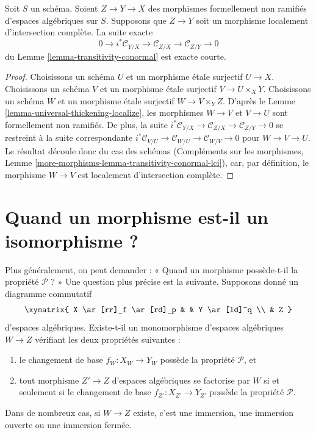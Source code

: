 \begin{lemma}
\label{lemma-transitivity-conormal-lci}
Soit $S$ un schéma. Soient $Z \to Y \to X$ des morphismes formellement non ramifiés
d'espaces algébriques sur $S$. Supposons que $Z \to Y$ soit un morphisme localement
d'intersection complète. La suite exacte
$$
0 \to i^*\mathcal{C}_{Y/X} \to
\mathcal{C}_{Z/X} \to
\mathcal{C}_{Z/Y} \to 0
$$
du
Lemme \ref{lemma-transitivity-conormal}
est exacte courte.
\end{lemma}

\begin{proof}
Choisissons un schéma $U$ et un morphisme étale surjectif $U \to X$.
Choisissons un schéma $V$ et un morphisme étale surjectif $V \to U \times_X Y$.
Choisissons un schéma $W$ et un morphisme étale surjectif $W \to V \times_Y Z$.
D'après le
Lemme \ref{lemma-universal-thickening-localize},
les morphismes $W \to V$ et $V \to U$ sont formellement non ramifiés.
De plus, la suite
$i^*\mathcal{C}_{Y/X} \to \mathcal{C}_{Z/X} \to \mathcal{C}_{Z/Y} \to 0$
se restreint à la suite correspondante
$i^*\mathcal{C}_{V/U} \to \mathcal{C}_{W/U} \to \mathcal{C}_{W/V} \to 0$
pour $W \to V \to U$. Le résultat découle donc du cas des schémas
(Compléments sur les morphismes, Lemme \ref{more-morphisms-lemma-transitivity-conormal-lci}),
car, par définition, le morphisme $W \to V$ est localement d'intersection
complète.
\end{proof}









\section{Quand un morphisme est-il un isomorphisme ?}
\label{section-when-isomorphism}

\noindent
Plus généralement, on peut demander :
« Quand un morphisme possède-t-il la propriété $\mathcal{P}$ ? »
Une question plus précise est la suivante. Supposons donné un diagramme commutatif
$$
\xymatrix{
X \ar[rr]_f \ar[rd]_p & & Y \ar[ld]^q \\
& Z
}
$$
d'espaces algébriques. Existe-t-il un monomorphisme d'espaces algébriques
$W \to Z$ vérifiant les deux propriétés suivantes :
\begin{enumerate}
\item le changement de base $f_W : X_W \to Y_W$ possède la propriété $\mathcal{P}$, et
\item tout morphisme $Z' \to Z$ d'espaces algébriques se factorise par $W$ si
et seulement si le changement de base $f_{Z'} : X_{Z'} \to Y_{Z'}$ possède la propriété
$\mathcal{P}$.
\end{enumerate}
Dans de nombreux cas, si $W \to Z$ existe, c'est une immersion, une immersion ouverte
ou une immersion fermée.

